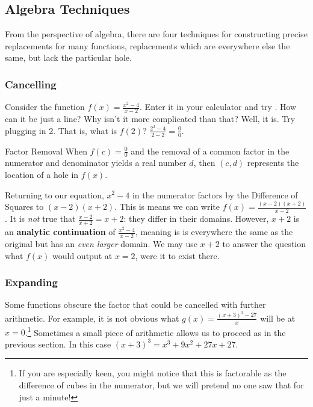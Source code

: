 \subsection{Algebra Techniques}
From the perspective of algebra, there are four techniques for constructing 
precise replacements for many functions, replacements which are everywhere else the same,
but lack the particular hole.

\subsubsection{Cancelling}
Consider the function $f(x) = \frac{x^2-4}{x-2}$.    Enter it in your calculator and try \Touche[style=function,principal={ZOOM},]
\Touche[style=number, principal=6].  How can it be just a line?  Why isn't it more complicated than that?  
Well, it is.  Try plugging in 2.  That is, what is $f(2)$?  $\frac{2^2-4}{2-2} = \frac{0}{0}$.


\begin{derivation}{Factor Removal}
When $f(c)=\frac{0}{0}$ and the removal of a common factor in the numerator and denominator yields a real number $d$,
then $(c,d)$ represents the location of a hole in $f(x)$.
\end{derivation}


Returning to our equation, $x^2-4$ in the numerator factors by the 
Difference of Squares to $(x-2)(x+2)$.  This is means
we can write $f(x)=\frac{(x-2)(x+2)}{x-2}$.  It is \emph{not} true that 
$\frac{x-2}{x+2} = x+2$: they differ in their domains.
However, $x+2$ is an \textbf{analytic continuation} of $\frac{x^2-4}{x-2}$, 
meaning is is everywhere the same as the
original but has an \textit{even larger} domain.  We may use $x+2$ to answer the 
question what $f(x)$ would output at $x=2$, were it to exist there.

\subsubsection{Expanding}
Some functions obscure the factor that could be cancelled with further arithmetic.  For example, it is not obvious
what $g(x)=\frac{(x+3)^3-27}{x}$ will be at $x=0$.\footnote{If you are especially keen, 
you might notice that this is factorable as the difference of cubes in the numerator, 
but we will pretend no one saw that for just a minute!}  Sometimes a small
piece of arithmetic allows us to proceed as in the previous section.  In this case $(x+3)^3=x^3+9x^2+27x+27$.


